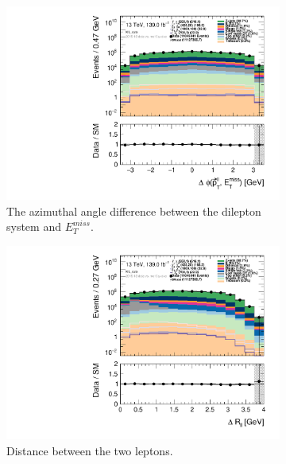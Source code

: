 \begin{figure}[H]
    \begin{subfigure}[t!]{0.49\textwidth}
        \includegraphics[width=\textwidth]{Figures/ML_cuts/hist1d_deltaPhi_ML_cuts.pdf}
    \caption{The azimuthal angle difference between the dilepton system and $E_T^{miss}$.}
    \label{fig:my_label}
    \end{subfigure}
    \begin{subfigure}[t!]{0.49\textwidth}
        \includegraphics[width=\textwidth]{Figures/ML_cuts/hist1d_deltaRll_ML_cuts.pdf}
    \caption{Distance between the two leptons.}
    \label{fig:my_label}
    \end{subfigure}
    \begin{subfigure}[t!]{0.49\textwidth}

\end{subfigure}
\end{figure}
